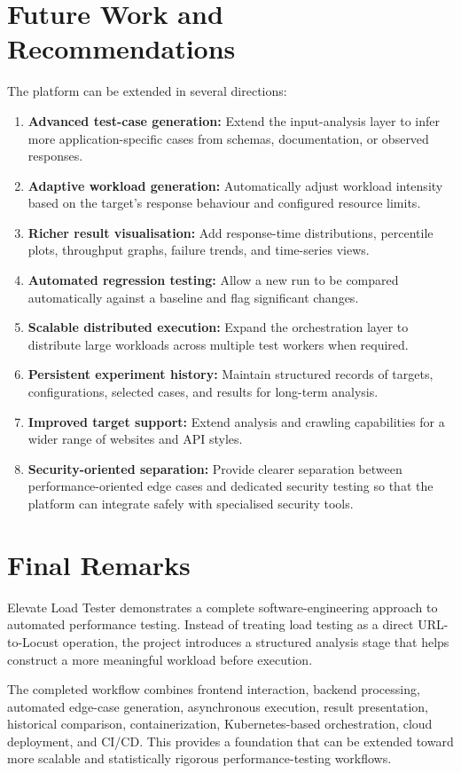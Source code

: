 \documentclass{tietreport}
\begin{document}
\section{Future Work and Recommendations}

The platform can be extended in several directions:

\begin{enumerate}
    \item \textbf{Advanced test-case generation:} Extend the input-analysis layer to infer more application-specific cases from schemas, documentation, or observed responses.
    \item \textbf{Adaptive workload generation:} Automatically adjust workload intensity based on the target's response behaviour and configured resource limits.
    \item \textbf{Richer result visualisation:} Add response-time distributions, percentile plots, throughput graphs, failure trends, and time-series views.
    \item \textbf{Automated regression testing:} Allow a new run to be compared automatically against a baseline and flag significant changes.
    \item \textbf{Scalable distributed execution:} Expand the orchestration layer to distribute large workloads across multiple test workers when required.
    \item \textbf{Persistent experiment history:} Maintain structured records of targets, configurations, selected cases, and results for long-term analysis.
    \item \textbf{Improved target support:} Extend analysis and crawling capabilities for a wider range of websites and API styles.
    \item \textbf{Security-oriented separation:} Provide clearer separation between performance-oriented edge cases and dedicated security testing so that the platform can integrate safely with specialised security tools.
\end{enumerate}

\section{Final Remarks}

Elevate Load Tester demonstrates a complete software-engineering approach to automated performance testing. Instead of treating load testing as a direct URL-to-Locust operation, the project introduces a structured analysis stage that helps construct a more meaningful workload before execution.

The completed workflow combines frontend interaction, backend processing, automated edge-case generation, asynchronous execution, result presentation, historical comparison, containerization, Kubernetes-based orchestration, cloud deployment, and CI/CD. This provides a foundation that can be extended toward more scalable and statistically rigorous performance-testing workflows.


\printbibliography[heading=bibintoc]
\end{document}
